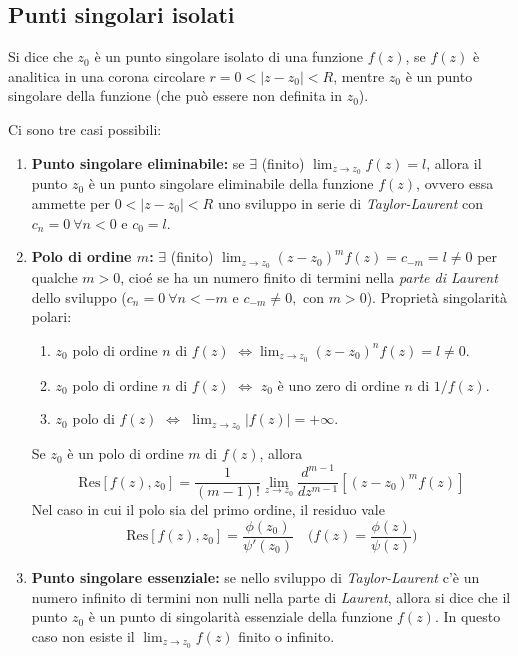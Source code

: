 \subsection*{Punti singolari isolati}

\begin{definition}
    Si dice che $z_0$ è un punto singolare isolato di una funzione $f(z)$, se $f(z)$ è analitica in una corona circolare $r=0<|z-z_0|<R$, mentre $z_0$ è un punto singolare della funzione (che può essere non definita in $z_0$).
\end{definition}

Ci sono tre casi possibili:
\begin{enumerate}
    \item \textbf{Punto singolare eliminabile:} se $\exists$ (finito) $\displaystyle\lim_{z\to z_0} f(z) =l$, allora il punto $z_0$ è un punto singolare eliminabile della funzione $f(z)$, ovvero essa ammette per $0<|z-z_0|<R$ uno sviluppo in serie di \textit{Taylor-Laurent} con $c_n=0\ \forall n<0\text{ e } c_0=l$.
    \item \textbf{Polo di ordine $m$:} $\exists$ (finito) $\displaystyle\lim_{z\to z_0}(z-z_0)^m f(z) =c_{-m}=l\neq0$ per qualche $m>0$, cioé se ha un numero finito di termini nella \textit{parte di Laurent} dello sviluppo ($c_n = 0\ \forall n<-m \text{ e } c_{-m}\neq0,\text{ con }m>0$).
    Proprietà singolarità polari:
    \begin{enumerate}
        \item $z_0$ polo di ordine $n$ di $f(z)$ $\iff \displaystyle\lim_{z\to z_0}(z-z_0)^nf(z)=l\neq0$.
        \item $z_0$ polo di ordine $n$ di $f(z)$ $\iff$ $z_0$ è uno zero di ordine $n$ di $1/f(z)$.
        \item $z_0$ polo di $f(z)$ $\iff$ $\displaystyle \lim_{z\to z_0}|f(z)|=+\infty$.
    \end{enumerate}
    Se $z_0$ è un polo di ordine $m$ di $f(z)$, allora 
    $$
        \text{Res}[f(z), z_0]=\frac{1}{(m-1)!}\lim_{z\to z_0}\frac{d^{m-1}}{dz^{m-1}}[(z-z_0)^m f(z)]
    $$
    Nel caso in cui il polo sia del primo ordine, il residuo vale
    \[
        \text{Res}[f(z),z_0]=\frac{\phi(z_0)}{\psi'(z_0)}\quad \Big( f(z)=\frac{\phi(z)}{\psi(z)}\Big)
    \]
    \item \textbf{Punto singolare essenziale:} se nello sviluppo di \textit{Taylor-Laurent} c'è un numero infinito di termini non nulli nella parte di \textit{Laurent}, allora si dice che il punto $z_0$ è un punto di singolarità essenziale della funzione $f(z)$. In questo caso non esiste il $\displaystyle \lim_{z\to z_0}f(z)$ finito o infinito.
\end{enumerate}

